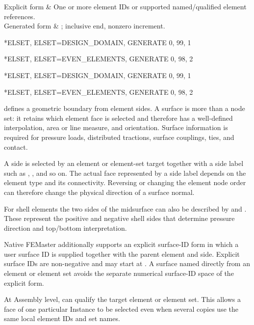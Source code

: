 \begin{keyworddata}
Explicit form & One or more element IDs or supported named/qualified element references. \\
Generated form & ; inclusive end, nonzero increment. \\
\end{keyworddata}

\exampleheading

\begin{dialectexamples}
\begin{femasterdeck}
*ELSET, ELSET=DESIGN_DOMAIN, GENERATE
0, 99, 1

*ELSET, ELSET=EVEN_ELEMENTS, GENERATE
0, 98, 2
\end{femasterdeck}
\begin{abaqusdeck}
*ELSET, ELSET=DESIGN_DOMAIN, GENERATE
0, 99, 1

*ELSET, ELSET=EVEN_ELEMENTS, GENERATE
0, 98, 2
\end{abaqusdeck}
\end{dialectexamples}


 defines a geometric boundary from element sides. A surface is more than a node set: it retains which element face is selected and therefore has a well-defined interpolation, area or line measure, and orientation. Surface information is required for pressure loads, distributed tractions, surface couplings, ties, and contact.

A side is selected by an element or element-set target together with a side label such as , , and so on. The actual face represented by a side label depends on the element type and its connectivity. Reversing or changing the element node order can therefore change the physical direction of a surface normal.

For shell elements the two sides of the midsurface can also be described by  and . These represent the positive and negative shell sides that determine pressure direction and top/bottom interpretation.

Native FEMaster additionally supports an explicit surface-ID form in which a user surface ID is supplied together with the parent element and side. Explicit surface IDs are non-negative and may start at . A surface named directly from an element or element set avoids the separate numerical surface-ID space of the explicit form.

At Assembly level,  can qualify the target element or element set. This allows a face of one particular Instance to be selected even when several copies use the same local element IDs and set names.

